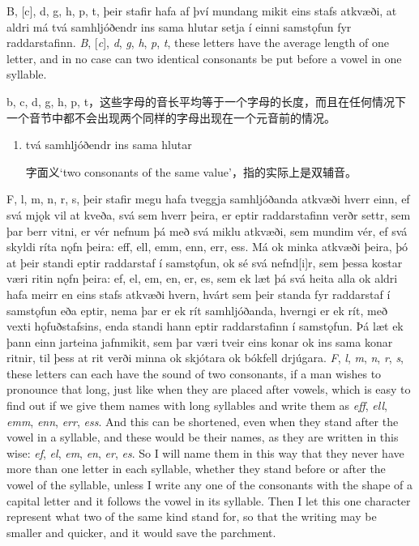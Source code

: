 \begin{paracol}{2}
    B, [c], d, g, h, p, t, þeir stafir hafa af því mundang mikit eins stafs atkvæði, at aldri má tvá samhljóðendr ins sama hlutar setja í einni samstǫfun fyr raddarstafinn.
    \switchcolumn
    \textit{B}, [\textit{c}], \textit{d}, \textit{g}, \textit{h}, \textit{p}, \textit{t}, these letters have the average length of one letter, and in no case can two identical consonants be put before a vowel in one syllable.
\end{paracol}
\begin{translation*}{}
    b, c, d, g, h, p, t，这些字母的音长平均等于一个字母的长度，而且在任何情况下一个音节中都不会出现两个同样的字母出现在一个元音前的情况。
\end{translation*}
\begin{grammar*}{}
    \begin{enumerate}[leftmargin=*]
        \item tvá samhljóðendr ins sama hlutar

              字面义`two consonants of the same value'，指的实际上是双辅音。
    \end{enumerate}
\end{grammar*}
\begin{paracol}{2}
    F, l, m, n, r, s, þeir stafir megu hafa tveggja samhljóðanda atkvæði hverr einn, ef svá mjǫk vil at kveða, svá sem hverr þeira, er eptir raddarstafinn verðr settr, sem þar berr vitni, er vér nefnum þá með svá miklu atkvæði, sem mundim vér, ef svá skyldi ríta nǫfn þeira: eff, ell, emm, enn, err, ess. Má ok minka atkvæði þeira, þó at þeir standi eptir raddarstaf í samstǫfun, ok sé svá nefnd[i]r, sem þessa kostar væri ritin nǫfn þeira: ef, el, em, en, er, es, sem ek læt þá svá heita alla ok aldri hafa meirr en eins stafs atkvæði hvern, hvárt sem þeir standa fyr raddarstaf í samstǫfun eða eptir, nema þar er ek rít samhljóðanda, hverngi er ek rít, með vexti hǫfuðstafsins, enda standi hann eptir raddarstafinn í samstǫfun. Þá læt ek þann einn jarteina jafnmikit, sem þar væri tveir eins konar ok ins sama konar ritnir, til þess at rit verði minna ok skjótara ok bókfell drjúgara.
    \switchcolumn
    \textit{F}, \textit{l}, \textit{m}, \textit{n}, \textit{r}, \textit{s}, these letters can each have the sound of two consonants, if a man wishes to pronounce that long, just like when they are placed after vowels, which is easy to find out if we give them names with long syllables and write them as \textit{eff}, \textit{ell}, \textit{emm}, \textit{enn}, \textit{err}, \textit{ess}. And this can be shortened, even when they stand after the vowel in a syllable, and these would be their names, as they are written in this wise: \textit{ef}, \textit{el}, \textit{em}, \textit{en}, \textit{er}, \textit{es}. So I will name them in this way that they never have more than one letter in each syllable, whether they stand before or after the vowel of the syllable, unless I write any one of the consonants with the shape of a capital letter and it follows the vowel in its syllable. Then I let this one character represent what two of the same kind stand for, so that the writing may be smaller and quicker, and it would save the parchment.
\end{paracol}
